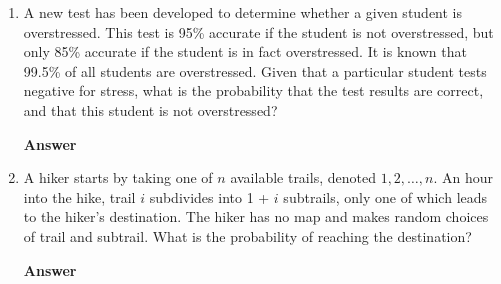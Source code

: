 \documentclass[paper=usletter, fontsize=12pt]{article}
\newcommand{\ans}{\textbf{Answer} \ }
\begin{document}
\begin{enumerate}
        \ans

        \item A new test has been developed to determine whether a given
        student is overstressed. This test is 95\% accurate if the student is
        not overstressed, but only 85\% accurate if the student is in fact
        overstressed. It is known that 99.5\% of all students are overstressed.
        Given that a particular student tests negative for stress, what is the
        probability that the test results are correct, and that this student is
        not overstressed?

        \ans

        \item A hiker starts by taking one of $n$ available trails, denoted $1,
        2, \ldots, n$. An hour into the hike, trail $i$ subdivides into 1 +
        $i$ subtrails, only one of which leads to the hiker’s destination. The
        hiker has no map and makes random choices of trail and subtrail. What
        is the probability of reaching the destination?

        \ans

    \end{enumerate}
\end{document}
